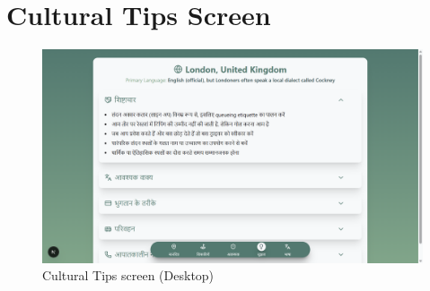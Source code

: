 \section{Cultural Tips Screen}
\begin{figure}[H]
    \centering
    \includegraphics[height=0.3\textheight,keepaspectratio]{images/5_culturaltips_desktop.png}
    \caption{Cultural Tips screen (Desktop)}
\end{figure}

